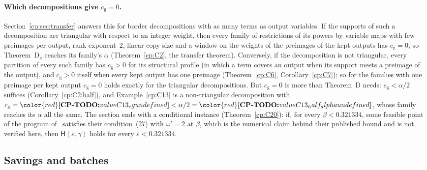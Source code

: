 \documentclass[11pt]{article}
\makeatletter
\theoremstyle{definition}
\theoremstyle{remark}
\DeclareRobustCommand{\CPTODO}[1]{{\color{red}\textbf{[CP-TODO:} #1\textbf{]}}}
\providecommand{\eps}{\varepsilon}
\newcommand{\Hyp}{\mathsf{H}}                 %
\newcommand{\cg}{c_{\mathrm g}}               %
\newcommand{\ThmD}{Theorem~D}                               %
\newcommand{\ThmDk}{Theorem~D\texorpdfstring{\ensuremath{_\kappa}}{\_kappa}}     %
\newcommand{\cpv}[1]{\ifcsname cpv@#1\endcsname\csname cpv@#1\endcsname\else\CPTODO{value #1 undefined}\fi}
\newcommand{\AlphaVXXZ}{0.321334}%
\makeatother
\begin{document}
\paragraph{Which decompositions give $\cg=0$.} Section~\ref{cp:sec:transfer} answers this for border decompositions with as many terms as output variables. If the supports of such a decomposition are triangular with respect to an integer weight, then every family of restrictions of its powers by variable maps with few preimages per output, rank exponent~$2$, linear copy size and a window on the weights of the preimages of the kept outputs has $\cg=0$, so \ThmDk{} reaches its family's $\alpha$ (Theorem~\ref{cp:C2}, the transfer theorem). Conversely, if the decomposition is not triangular, every partition of every such family has $\cg>0$ for its structural profile (in which a term covers an output when its support meets a preimage of the output), and $\cg>0$ itself when every kept output has one preimage (Theorem~\ref{cp:C6}, Corollary~\ref{cp:C7}); so for the families with one preimage per kept output $\cg=0$ holds exactly for the triangular decompositions. But $\cg=0$ is more than \ThmD{} needs: $\cg<\alpha/2$ suffices (Corollary~\ref{cp:C2:half}), and Example~\ref{cp:C13} is a non-triangular decomposition with $\cg=\cpv{C13_cg}<\alpha/2=\cpv{C13_half_alpha}$, whose family reaches its $\alpha$ all the same. The section ends with a conditional instance (Theorem~\ref{cp:C20}): if, for every $\beta<\AlphaVXXZ$, some feasible point of the program of~\cite{VXXZ24} satisfies their condition~(27) with $\omega'=2$ at $\beta$, which is the numerical claim behind their published bound and is not verified here, then $\Hyp(\eps,\gamma)$ holds for every $\eps<\AlphaVXXZ$.

\subsection{Savings and batches}\label{cp:sec:intro:gamma}
\end{document}
